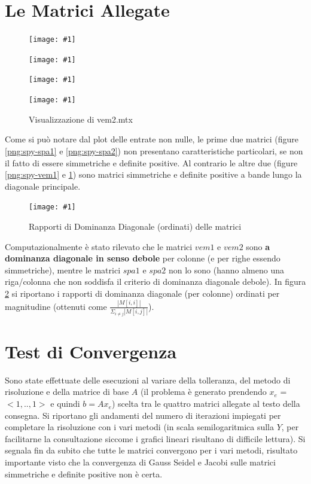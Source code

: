 \documentclass[a4paper,11pt,oneside, table]{article}
\newcommand{\putimage}[4] {
	\begin{figure}[H]
	    \centering
	    \texttt{[image: \#1]}
	    \caption{#2}\label{#3}
	\end{figure}
}
\newcommand{\putsubimage}[5] {
  \begin{minipage}{{#4}\linewidth}
	    \centering
      \texttt{[image: \#1]}
	    \caption{#2}\label{#3}
	\end{minipage}
}
\newcommand{\putimagequadruple}[4] {
  \begin{figure}[!htb]
      \centering
      #1
      \hspace{0.5cm}
      #2
      \linebreak
      #3
      \hspace{0.5cm}
      #4
  \end{figure}
}
\begin{document}
\section{Le Matrici Allegate}

\putimagequadruple
  {\putsubimage{./images/spy-spa1.png}{Visualizzazione di spa1.mtx}{png:spy-spa1}{0.4}{0.8}}
  {\putsubimage{./images/spy-spa2.png}{Visualizzazione di spa2.mtx}{png:spy-spa2}{0.4}{0.8}}
  {\putsubimage{./images/spy-vem1.png}{Visualizzazione di vem1.mtx}{png:spy-vem1}{0.4}{0.8}}
  {\putsubimage{./images/spy-vem2.png}{Visualizzazione di vem2.mtx}{png:spy-vem2}{0.4}{0.8}}

Come si pu\`o notare dal plot delle entrate non nulle, le prime due matrici (figure \ref{png:spy-spa1} e \ref{png:spy-spa2}) non presentano caratteristiche particolari, se non il fatto di essere simmetriche e definite positive.
Al contrario le altre due (figure \ref{png:spy-vem1} e \ref{png:spy-vem2}) sono matrici simmetriche e definite positive a bande lungo la diagonale principale.

\putimage{./images/dominance.png}{Rapporti di Dominanza Diagonale (ordinati) delle matrici}{png:dominance}{0.99}

Computazionalmente \`e stato rilevato che le matrici $vem1$ e $vem2$ sono \textbf{a dominanza diagonale in senso debole} per colonne (e per righe essendo simmetriche), mentre le matrici $spa1$ e $spa2$ non lo sono (hanno almeno una riga/colonna che non soddisfa il criterio di dominanza diagonale debole).
In figura \ref{png:dominance} si riportano i rapporti di dominanza diagonale (per colonne) ordinati per magnitudine (ottenuti come $\frac {| M[i, i] |} {\Sigma _ {i \ne j} | M[i, j] |}$).

\section{Test di Convergenza}

Sono state effettuate delle esecuzioni al variare della tolleranza, del metodo di risoluzione e della matrice di base $A$ (il problema \`e generato prendendo $x_e$ = $<1,.., 1>$ e quindi $b = Ax_e$) scelta tra le quattro matrici allegate al testo della consegna.
Si riportano gli andamenti del numero di iterazioni impiegati per completare la risoluzione con i vari metodi (in scala semilogaritmica sulla $Y$, per facilitarne la consultazione siccome i grafici lineari risultano di difficile lettura).
Si segnala fin da subito che tutte le matrici convergono per i vari metodi, risultato importante visto che la convergenza di Gauss Seidel e Jacobi sulle matrici simmetriche e definite positive non \`e certa.
\end{document}
